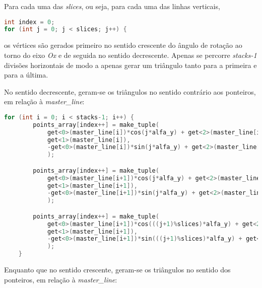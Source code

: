 \documentclass[14pt, a4 paper]{report}
\begin{document}
Para cada uma das \textit{slices}, ou seja, para cada uma das linhas verticais,

\begin{lstlisting}[language = c++]
int index = 0;
for (int j = 0; j < slices; j++) {
\end{lstlisting}

os vértices são gerados primeiro no sentido crescente do ângulo de rotação ao torno do eixo \textit{Ox} e de seguida no sentido decrescente. Apenas se percorre \textit{stacks-1} divisões horizontais de modo a apenas gerar um triângulo tanto para a primeira e para a última.

No sentido decrescente, geram-se os triângulos no sentido contrário aos ponteiros, em relação à \textit{master\_line}:

\begin{lstlisting}[language = c++]
    for (int i = 0; i < stacks-1; i++) {
        points_array[index++] = make_tuple(
            get<0>(master_line[i])*cos(j*alfa_y) + get<2>(master_line[i])*sin(j*alfa_y),
            get<1>(master_line[i]),
            -get<0>(master_line[i])*sin(j*alfa_y) + get<2>(master_line[i])*cos(j*alfa_y)
            );

        points_array[index++] = make_tuple(
            get<0>(master_line[i+1])*cos(j*alfa_y) + get<2>(master_line[i+1])*sin(j*alfa_y),
            get<1>(master_line[i+1]),
            -get<0>(master_line[i+1])*sin(j*alfa_y) + get<2>(master_line[i+1])*cos(j*alfa_y)
            );

        points_array[index++] = make_tuple(
            get<0>(master_line[i+1])*cos(((j+1)%slices)*alfa_y) + get<2>(master_line[i+1])*sin(((j+1)%slices)*alfa_y),
            get<1>(master_line[i+1]),
            -get<0>(master_line[i+1])*sin(((j+1)%slices)*alfa_y) + get<2>(master_line[i+1])*cos(((j+1)%slices)*alfa_y)
            );
    }

\end{lstlisting}

Enquanto que no sentido crescente, geram-se os triângulos no sentido dos ponteiros, em relação à \textit{master\_line}:
\end{document}
